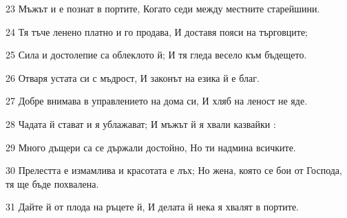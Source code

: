 \par 23 Мъжът и е познат в портите, Когато седи между местните старейшини.
\par 24 Тя тъче ленено платно и го продава, И доставя пояси на търговците;
\par 25 Сила и достолепие са облеклото й; И тя гледа весело към бъдещето.
\par 26 Отваря устата си с мъдрост, И законът на езика й е благ.
\par 27 Добре внимава в управлението на дома си, И хляб на леност не яде.
\par 28 Чадата й стават и я ублажават; И мъжът й я хвали казвайки :
\par 29 Много дъщери са се държали достойно, Но ти надмина всичките.
\par 30 Прелестта е измамлива и красотата е лъх; Но жена, която се бои от Господа, тя ще бъде похвалена.
\par 31 Дайте й от плода на ръцете й, И делата й нека я хвалят в портите.

